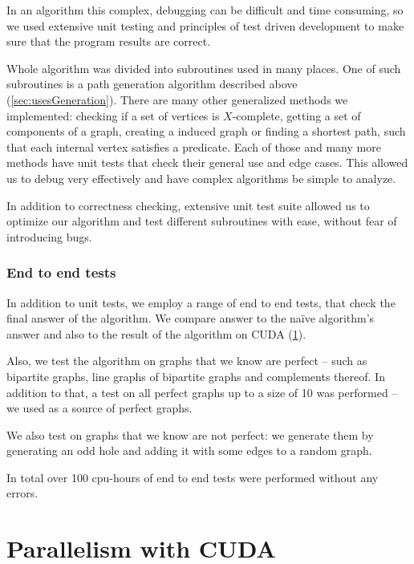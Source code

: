 In an algorithm this complex, debugging can be difficult and time consuming, so we used extensive unit testing and principles of test driven development to make sure that the program results are correct.

Whole algorithm was divided into subroutines used in many places. One of such subroutines is a path generation algorithm described above (\cref{sec:usesGeneration}). There are many other generalized methods we implemented: checking if a set of vertices is $X$-complete, getting a set of components of a graph, creating a induced graph or finding a shortest path, such that each internal vertex satisfies a predicate. Each of those and many more methods have unit tests that check their general use and edge cases. This allowed us to debug very effectively and have complex algorithms be simple to analyze.

In addition to correctness checking, extensive unit test suite allowed us to optimize our algorithm and test different subroutines with ease, without fear of introducing bugs.

\subsubsection{End to end tests}

In addition to unit tests, we employ a range of end to end tests, that check the final answer of the algorithm. We compare answer to the na\"ive algorithm's answer and also to the result of the algorithm on CUDA (\cref{sec:CUDA}).

Also, we test the algorithm on graphs that we know are perfect -- such as bipartite graphs, line graphs of bipartite graphs and complements thereof. In addition to that, a test on all perfect graphs up to a size of 10 was performed -- we used \cite{graphRepo} as a source of perfect graphs.

We also test on graphs that we know are not perfect: we generate them by generating an odd hole and adding it with some edges to a random graph.

In total over 100 cpu-hours of end to end tests were performed without any errors.

\section{Parallelism with CUDA}
\label{sec:CUDA}

